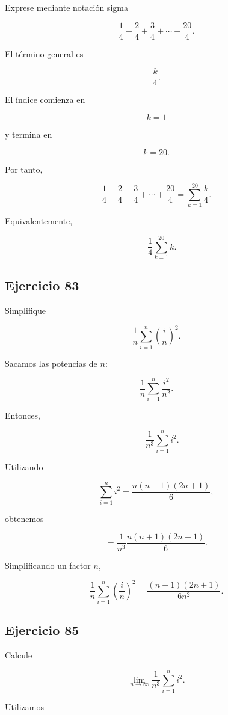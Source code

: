\documentclass[12pt]{article}
\begin{document}
Exprese mediante notación sigma

\[
\frac14+\frac24+\frac34+\cdots+\frac{20}{4}.
\]

El término general es

\[
\frac{k}{4}.
\]

El índice comienza en

\[
k=1
\]

y termina en

\[
k=20.
\]

Por tanto,

\[
\boxed{
\frac14+\frac24+\frac34+\cdots+\frac{20}{4}
=
\sum_{k=1}^{20}\frac{k}{4}
}.
\]

Equivalentemente,

\[
\boxed{
=
\frac14\sum_{k=1}^{20}k
}.
\]

\subsection*{Ejercicio 83}

Simplifique

\[
\frac1n
\sum_{i=1}^{n}
\left(\frac{i}{n}\right)^2.
\]

Sacamos las potencias de \(n\):

\[
\frac1n
\sum_{i=1}^{n}
\frac{i^2}{n^2}.
\]

Entonces,

\[
=
\frac{1}{n^3}
\sum_{i=1}^{n}i^2.
\]

Utilizando

\[
\sum_{i=1}^{n}i^2
=
\frac{n(n+1)(2n+1)}6,
\]

obtenemos

\[
=
\frac{1}{n^3}
\frac{n(n+1)(2n+1)}6.
\]

Simplificando un factor \(n\),

\[
\boxed{
\frac1n
\sum_{i=1}^{n}
\left(\frac{i}{n}\right)^2
=
\frac{(n+1)(2n+1)}{6n^2}
}.
\]

\subsection*{Ejercicio 85}

Calcule

\[
\lim_{n\to\infty}
\frac{1}{n^3}
\sum_{i=1}^{n}i^2.
\]

Utilizamos
\end{document}
